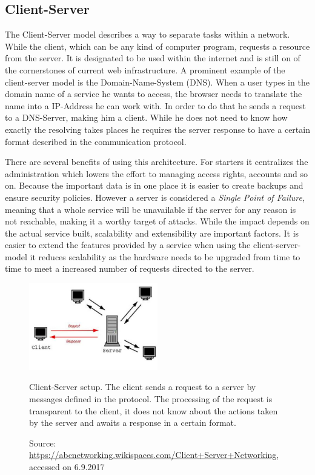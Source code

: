 \subsection{Client-Server}
The Client-Server model describes a way to separate tasks within a network. While the client, which can be any kind of computer program, requests a resource from the server. It is designated to be used within the internet and is still on of the cornerstones of current web infrastructure. A prominent example of the client-server model is the Domain-Name-System (DNS). When a user types in the domain name of a service he wants to access, the browser needs to translate the name into a IP-Address he can work with. In order to do that he sends a request to a DNS-Server, making him a client. While he does not need to know how exactly the resolving takes places he requires the server response to have a certain format described in the communication protocol. 

There are several benefits of using this architecture. For starters it centralizes the administration which lowers the effort to managing access rights, accounts and so on. Because the important data is in one place it is easier to create backups and ensure security policies. However a server is considered a \emph{Single Point of Failure}, meaning that a whole service will be unavailable if the server for any reason is not reachable, making it a worthy target of attacks. While the impact depends on the actual service built, scalability and extensibility are important factors. It is easier to extend the features provided by a service when using the client-server-model it reduces scalability as the hardware needs to be upgraded from time to time to meet a increased number of requests directed to the server.
\begin{figure}[htbp]
	\centering
	\includegraphics[width=0.5\textwidth]{./content/pictures/client-server.jpg}
	\caption{Client-Server setup. The client sends a request to a server by messages defined in the protocol. The processing of the request is transparent to the client, it does not know about the actions taken by the server and awaits a response in a certain format.}
	\caption*{Source: \href{https://abcnetworking.wikispaces.com/Client+Server+Networking}{https://abcnetworking.wikispaces.com/Client+Server+Networking}, accessed on 6.9.2017}
\end{figure}

